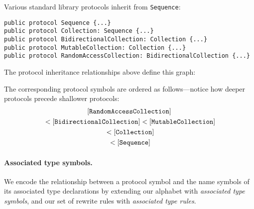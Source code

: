 \documentclass[../generics]{subfiles}
\begin{document}
\begin{example}\label{protocol reduction order example}
Various standard library protocols inherit from \texttt{Sequence}:
\begin{Verbatim}
public protocol Sequence {...}
public protocol Collection: Sequence {...}
public protocol BidirectionalCollection: Collection {...}
public protocol MutableCollection: Collection {...}
public protocol RandomAccessCollection: BidirectionalCollection {...}
\end{Verbatim}
The protocol inheritance relationships above define this graph:
\begin{center}
\end{center}
The corresponding protocol symbols are ordered as follows---notice how deeper protocols precede shallower protocols:
\begin{gather*}
[\texttt{RandomAccessCollection}]\\
{} < [\texttt{BidirectionalCollection}]<[\texttt{MutableCollection}]\\
{} < [\texttt{Collection}]\\
{} < [\texttt{Sequence}]
\end{gather*}
\end{example}

\paragraph{Associated type symbols.}
We encode the relationship between a protocol symbol and the name symbols of its associated type declarations by extending our alphabet with \emph{associated type symbols}, and our set of rewrite rules with \emph{associated type rules}.
\end{document}
